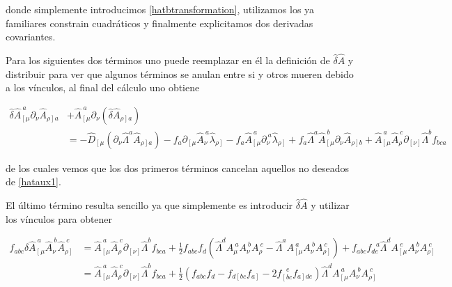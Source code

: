 \documentclass{article}
\numberwithin{equation}{section}
\begin{document}
donde simplemente introducimos \ref{hatbtransformation}, utilizamos los ya familiares constrain cuadráticos y finalmente explicitamos dos derivadas covariantes.

Para los siguientes dos términos uno puede reemplazar en él la definición de $ \hat{\delta} \hat{A} $ y distribuir para ver que algunos términos se anulan entre si y otros mueren debido a los vínculos, al final del cálculo uno obtiene

\begin{equation}\label{hataux2}
\begin{aligned}
\hat{\delta} \hat{A}_{\left[ \mu\right.}^{\ a} \partial_{\nu} \hat{A}_{\left. \rho \right] a } &+ \hat{A}_{\left[ \mu\right.}^{\ a} \partial_{\nu} \left(\hat{\delta} \hat{A}_{\left. \rho \right] a }\right)\\
&= - \hat{D}_{\left[ \mu \right.} \left(\partial_{\nu} \hat{\Lambda}^a \hat{A}_{\left.\rho \right] a} \right) - f_a\partial_{\left[ \mu \right.}\hat{A}_{\nu}^{\ a} \hat{\lambda}_{\left.\rho\right]} - f_a\hat{A}_{\left[ \mu \right.}^{\ a}\partial_{\nu}^{\ a} \hat{\lambda}_{\left.\rho\right]} + f_a \hat{\Lambda}^a \hat{A}_{\left[\mu\right.}^{\ b} \partial_{\nu} \hat{A}_{\left.\rho\right] b} + \hat{A}_{\left[\mu\right.}^{\ a} \hat{A}_{\rho}^{\ c} \partial_{\left[ \nu\right]} \hat{\Lambda}^b f_{b c a}
\end{aligned}
\end{equation} 

de los cuales vemos que los dos primeros términos cancelan aquellos no deseados de \ref{hataux1}. 

El último término resulta sencillo ya que simplemente es introducir $ \hat{\delta} \hat{A} $ y utilizar los vínculos para obtener

\begin{equation}
\begin{aligned}
f_{a b c} \hat{\delta} \hat{A}_{\left[ \mu \right.}^{\ a} \hat{A}_{\nu}^{\ b}  \hat{A}_{\left.\rho\right]}^{\ c} &= \hat{A}_{\left[\mu\right.}^{\ a} \hat{A}_{\rho}^{\ c} \partial_{\left[ \nu\right]} \hat{\Lambda}^b f_{b c a} + \frac{1}{2} f_{a b c} f_d \left( \hat{\Lambda}^d A_{\mu}^{\ a} A_{\nu}^{\ b} A_{\rho}^{\ c} - \hat{\Lambda}^a A_{\left[\mu\right.}^{\ a} A_{\nu}^{\ b} A_{\left.\rho\right]}^{\ c} \right) + f_{a b c} f_{de}^{\ \ \ a} \hat{\Lambda}^d A_{\left[\mu\right.}^{\ e} A_{\nu}^{\ b} A_{\left.\rho\right]}^{\ c}\\
&= \hat{A}_{\left[\mu\right.}^{\ a} \hat{A}_{\rho}^{\ c} \partial_{\left[ \nu\right]} \hat{\Lambda}^b f_{b c a} + \frac{1}{2} \left( f_{a b c}f_d - f_{d \left[b c\right.} f_{\left.a\right]} -2 f_{\left[b c\right.}^{\ \ \ e} f_{\left. a\right] d e} \right) \hat{\Lambda}^d A_{\left[\mu\right.}^{\ a} A_{\nu}^{\ b} A_{\left.\rho\right]}^{\ c}
\end{aligned}
\end{equation}
\end{document}
